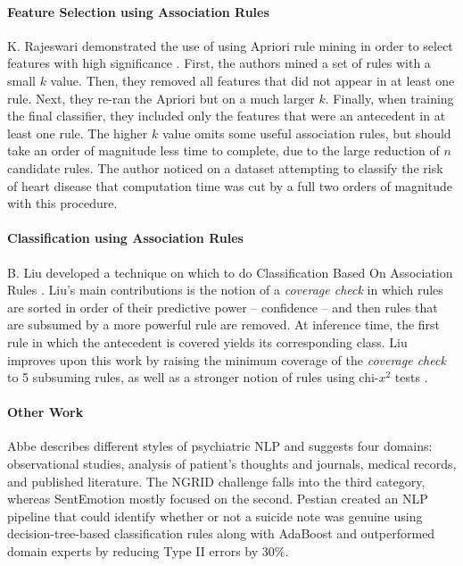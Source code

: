 \paragraph{Feature Selection using Association Rules} K. Rajeswari demonstrated the use of using \textsf{Apriori} rule mining in order to select features with high significance \cite{rajeswari}. First, the authors mined a set of rules with a small $k$ value. Then, they removed all features that did not appear in at least one rule. Next, they re-ran the \textsf{Apriori} but on a much larger $k$. Finally, when training the final classifier, they included only the features that were an antecedent in at least one rule. The higher $k$ value omits some useful association rules, but should take an order of magnitude less time to complete, due to the large reduction of $n$ candidate rules. The author noticed on a dataset attempting to classify the risk of heart disease that computation time was cut by a full two orders of magnitude with this procedure.

\paragraph{Classification using Association Rules} B. Liu developed a technique on which to do Classification Based On Association Rules \cite{cba}. Liu's main contributions is the notion of a \textit{coverage check} in which rules are sorted in order of their predictive power -- confidence -- and then rules that are subsumed by a more powerful rule are removed. At inference time, the first rule in which the antecedent is covered yields its corresponding class. Liu improves upon this work by raising the minimum coverage of the \textit{coverage check} to 5 subsuming rules, as well as a stronger notion of rules using chi-$x^2$ tests \cite{cmar}. 

\paragraph{Other Work} Abbe \cite{abbe} describes different styles of psychiatric NLP and suggests four domains: observational studies, analysis of patient's thoughts and journals, medical records, and published literature. The NGRID challenge falls into the third category, whereas SentEmotion mostly focused on the second. Pestian \cite{pestian} created an NLP pipeline that could identify whether or not a suicide note was genuine using decision-tree-based classification rules along with AdaBoost and outperformed domain experts by reducing Type II errors by 30\%.

